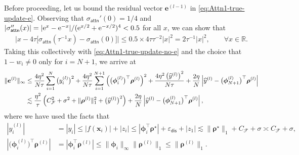 \documentclass[english]{article}
\begin{document}
\begin{itemize}
Before proceeding, let us bound the residual vector ${\bm e}^{(l-1)}$ in \eqref{eq:Attn1-true-update-e}. 
Observing that $\sigma_{\mathsf{attn}}'(0) = 1/4$ and $|\sigma_{\mathsf{attn}}''(x)|=|{\rm e}^x - {\rm e}^{-x}|/({\rm e}^{x/2} + {\rm e}^{-x/2})^4 < 0.5$ for all $x$, we can show that
%
\begin{align}\label{eq:approx-sigma-att}
\Big|x - 4\tau\big[\sigma_{\mathsf{attn}}(\tau^{-1} x) - \sigma_{\mathsf{attn}}(0)\big]\Big| \le 0.5\times 4\tau \tau^{-2} |x|^2 = 2\tau^{-1}|x|^2,\qquad \forall x\in\mathbb{R}.
\end{align}
%
Taking this collectively with \eqref{eq:Attn1-true-update-no-e} and the choice that $1-w_i\neq 0$ only for $i=N+1$, we arrive at
%
\begin{align}\label{eq:proof-bound-e-pre}
\|{\bm e}^{(l)}\|_{\infty}
&\le \frac{4\eta^2}{N\tau}\sum_{i=1}^{N}\big(y_i^{(l)}\big)^2 + \frac{4\eta^2}{N\tau}\sum_{i=1}^{N+1}\left(\big({\bm \phi}_i^{(l)}\big)^{\top}{\bm \rho}^{(l)}\right)^2 \notag + \frac{4\eta^2\left(\widehat{y}^{(l)}\right)^2}{N\tau} + \frac{2\eta}{N}\left|\widehat{y}^{(l)} - \big({\bm \phi}_{N+1}^{(l)}\big)^{\top}{\bm \rho}^{(l)}\right|\notag\\
&\lesssim \frac{\eta^2}{\tau}\left(C_{\mathcal{F}}^2 + \sigma^2 + \|{\bm \rho}^{(l)}\|_1^2 + \big(\widehat{y}^{(l)}\big)^2\right)+ \frac{2\eta}{N}\left|\widehat{y}^{(l)} - \big({\bm \phi}_{N+1}^{(l)}\big)^{\top}{\bm \rho}^{(l)}\right|,
\end{align}
where we have used the facts that 
%
\begin{align*}
|y_i^{(l)}| &= |y_i|\le |f({\bm x}_i)| + |z_i|\le|{\bm \phi}_i^{\top}{\bm \rho}^{\star}| + \varepsilon_{\mathsf{dis}} + |z_1|\lesssim \|{\bm \rho}^{\star}\|_1 + C_{\mathcal{F}} + \sigma \asymp C_{\mathcal{F}} + \sigma, \\ 
|\big({\bm \phi}_{i}^{(l)}\big)^{\top}{\bm \rho}^{(l)}| &= |{\bm \phi}_{i}^{\top}{\bm \rho}^{(l)}|\le \|{\bm \phi}_{i}\|_{\infty}\|{\bm \rho}^{(l)}\|_1\le \|{\bm \rho}^{(l)}\|_1.
\end{align*}


\end{itemize}
\end{document}

